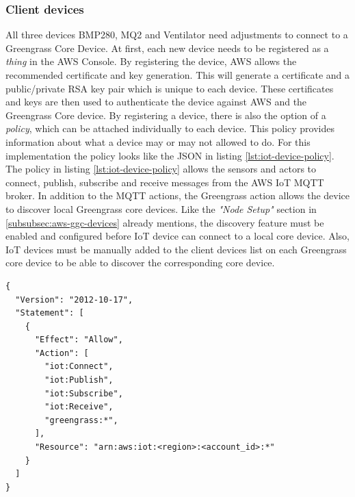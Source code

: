 \subsubsection*{Client devices}
All three devices BMP280, MQ2 and Ventilator need adjustments to connect to a Greengrass Core Device. At first, each new device needs to be registered as a \textit{thing} in the AWS Console. By registering the device, AWS allows the recommended certificate and key generation. This will generate a certificate and a public/private RSA key pair which is unique to each device. These certificates and keys are then used to authenticate the device against AWS and the Greengrass Core device. By registering a device, there is also the option of a \textit{policy}, which can be attached individually to each device. This policy provides information about what a device may or may not allowed to do. For this implementation the policy looks like the JSON in listing \ref{lst:iot-device-policy}. The policy in listing \ref{lst:iot-device-policy} allows the sensors and actors to connect, publish, subscribe and receive messages from the AWS IoT \gls{MQTT} broker. In addition to the \gls{MQTT} actions, the Greengrass action allows the device to discover local Greengrass core devices. Like the \textit{"Node Setup"} section in \ref{subsubsec:aws-ggc-devices} already mentions, the discovery feature must be enabled and configured before IoT device can connect to a local core device. Also, IoT devices must be manually added to the client devices list on each Greengrass core device to be able to discover the corresponding core device.

\begin{lstlisting}[caption={Client device policy.},label={lst:iot-device-policy},captionpos=b]
{
  "Version": "2012-10-17",
  "Statement": [
    {
      "Effect": "Allow",
      "Action": [
        "iot:Connect",
        "iot:Publish",
        "iot:Subscribe",
        "iot:Receive",
        "greengrass:*",
      ],
      "Resource": "arn:aws:iot:<region>:<account_id>:*"
    }
  ]
}
\end{lstlisting}

